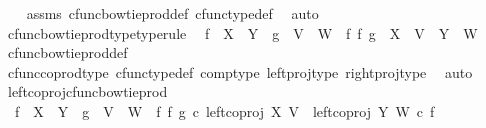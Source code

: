\begin{isabellebody}
%
\isadelimproof
\ \ %
\endisadelimproof
%
\isatagproof
{}\isamarkupfalse%
\ assms\ cfunc{\isacharunderscore}{\kern0pt}bowtie{\isacharunderscore}{\kern0pt}prod{\isacharunderscore}{\kern0pt}def\ cfunc{\isacharunderscore}{\kern0pt}type{\isacharunderscore}{\kern0pt}def\ \isamarkupfalse%
\ auto%
\endisatagproof
{\isafoldproof}%
%
\isadelimproof
\isanewline
%
\endisadelimproof
\isanewline
{}\isamarkupfalse%
\ cfunc{\isacharunderscore}{\kern0pt}bowtie{\isacharunderscore}{\kern0pt}prod{\isacharunderscore}{\kern0pt}type{\isacharbrackleft}{\kern0pt}type{\isacharunderscore}{\kern0pt}rule{\isacharbrackright}{\kern0pt}{\isacharcolon}{\kern0pt}\isanewline
\ \ {\isachardoublequoteopen}f\ {\isacharcolon}{\kern0pt}\ X\ {\isasymrightarrow}\ Y\ {\isasymLongrightarrow}\ g\ {\isacharcolon}{\kern0pt}\ V\ {\isasymrightarrow}\ W\ {\isasymLongrightarrow}\ f\ {\isasymbowtie}\isactrlsub f\ g\ {\isacharcolon}{\kern0pt}\ X\ {\isasymCoprod}\ V\ {\isasymrightarrow}\ Y\ {\isasymCoprod}\ W{\isachardoublequoteclose}\isanewline
%
\isadelimproof
\ \ %
\endisadelimproof
%
\isatagproof
{}\isamarkupfalse%
\ cfunc{\isacharunderscore}{\kern0pt}bowtie{\isacharunderscore}{\kern0pt}prod{\isacharunderscore}{\kern0pt}def\isanewline
\ \ \isamarkupfalse%
\ cfunc{\isacharunderscore}{\kern0pt}coprod{\isacharunderscore}{\kern0pt}type\ cfunc{\isacharunderscore}{\kern0pt}type{\isacharunderscore}{\kern0pt}def\ comp{\isacharunderscore}{\kern0pt}type\ left{\isacharunderscore}{\kern0pt}proj{\isacharunderscore}{\kern0pt}type\ right{\isacharunderscore}{\kern0pt}proj{\isacharunderscore}{\kern0pt}type\ \isamarkupfalse%
\ auto%
\endisatagproof
{\isafoldproof}%
%
\isadelimproof
\isanewline
%
\endisadelimproof
\isanewline
{}\isamarkupfalse%
\ left{\isacharunderscore}{\kern0pt}coproj{\isacharunderscore}{\kern0pt}cfunc{\isacharunderscore}{\kern0pt}bowtie{\isacharunderscore}{\kern0pt}prod{\isacharcolon}{\kern0pt}\isanewline
\ \ {\isachardoublequoteopen}f\ {\isacharcolon}{\kern0pt}\ X\ {\isasymrightarrow}\ Y\ {\isasymLongrightarrow}\ g\ {\isacharcolon}{\kern0pt}\ V\ {\isasymrightarrow}\ W\ {\isasymLongrightarrow}\ {\isacharparenleft}{\kern0pt}f\ {\isasymbowtie}\isactrlsub f\ g{\isacharparenright}{\kern0pt}\ {\isasymcirc}\isactrlsub c\ left{\isacharunderscore}{\kern0pt}coproj\ X\ V\ {\isacharequal}{\kern0pt}\ left{\isacharunderscore}{\kern0pt}coproj\ Y\ W\ {\isasymcirc}\isactrlsub c\ f{\isachardoublequoteclose}\isanewline
%
\isadelimproof
\ \ %
\endisadelimproof
%
\isatagproof
{}\isamarkupfalse%

\end{isabellebody}

